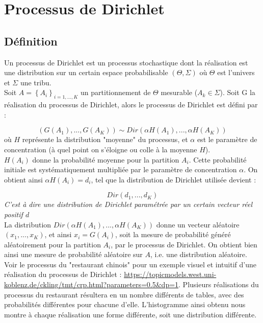 \documentclass[french]{article}
\numberwithin{equation}{section}
\begin{document}
\section{Processus de Dirichlet}

\subsection{Définition}

Un processus de Dirichlet est un processus stochastique dont la réalisation est une distribution sur un certain espace probabilisable $(\Theta, \Sigma)$ où $\Theta$ est l'univers et $\Sigma$ une tribu.\\

Soit $A = \left\{ A_i \right\}_{i=1, ..., K}$ un partitionnement de $\Theta$ mesurable ($A_k \in \Sigma$). Soit G la réalisation du processus de Dirichlet, alors le processus de Dirichlet est défini par :

\begin{equation}
(G(A_1), ..., G(A_K)) \sim Dir(\alpha H(A_1), ..., \alpha H(A_K))
\end{equation}
où $H$ représente la distribution "moyenne" du processus, et $\alpha$ est le paramètre de concentration (à quel point on s'éloigne ou colle à la moyenne $H$). \\

$H(A_i)$ donne la probabilité moyenne pour la partition $A_i$. Cette probabilité initiale est systématiquement multipliée par le paramètre de concentration $\alpha$. On obtient ainsi $\alpha H(A_i) = d_i$, tel que la distribution de Dirichlet utilisée devient :

\[ Dir(d_1, ..., d_K) \]
\textit{C'est à dire une distribution de Dirichlet paramétrée par un certain vecteur réel positif $d$}\\

La distribution $Dir(\alpha H(A_1), ..., \alpha H(A_K))$ donne un vecteur aléatoire $(x_1, ..., x_K)$, et ainsi $x_i = G(A_i)$, soit la mesure de probabilité généré aléatoirement pour la partition $A_i$, par le processus de Dirichlet. On obtient bien ainsi une mesure de probabilité aléatoire sur $A$, i.e. une distribution aléatoire.\\

Voir le processus du "restaurant chinois" pour un exemple visuel et intuitif d'une réalisation du processus de Dirichlet : \url{https://topicmodels.west.uni-koblenz.de/ckling/tmt/crp.html?parameters=0.5&dp=1}. Plusieurs réalisations du processus du restaurant résultera en un nombre différents de tables, avec des probabilités différentes pour chacune d'elle. L'histogramme ainsi obtenu nous montre à chaque réalisation une forme différente, soit une distribution différente.\\
\end{document}
